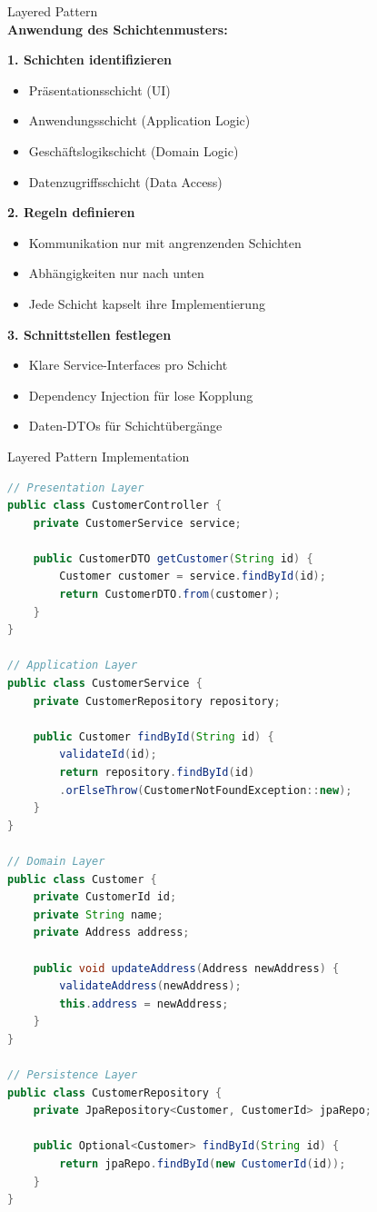 \begin{KR}{Layered Pattern}\\
\textbf{Anwendung des Schichtenmusters:}

\textbf{1. Schichten identifizieren}
\begin{itemize}
    \item Präsentationsschicht (UI)
    \item Anwendungsschicht (Application Logic)
    \item Geschäftslogikschicht (Domain Logic)
    \item Datenzugriffsschicht (Data Access)
\end{itemize}

\textbf{2. Regeln definieren}
\begin{itemize}
    \item Kommunikation nur mit angrenzenden Schichten
    \item Abhängigkeiten nur nach unten
    \item Jede Schicht kapselt ihre Implementierung
\end{itemize}

\textbf{3. Schnittstellen festlegen}
\begin{itemize}
    \item Klare Service-Interfaces pro Schicht
    \item Dependency Injection für lose Kopplung
    \item Daten-DTOs für Schichtübergänge
\end{itemize}
\end{KR}

\begin{example2}{Layered Pattern Implementation}
\begin{lstlisting}[language=Java, style=basesmol]
// Presentation Layer
public class CustomerController {
    private CustomerService service;
    
    public CustomerDTO getCustomer(String id) {
        Customer customer = service.findById(id);
        return CustomerDTO.from(customer);
    }
}

// Application Layer
public class CustomerService {
    private CustomerRepository repository;
    
    public Customer findById(String id) {
        validateId(id);
        return repository.findById(id)
        .orElseThrow(CustomerNotFoundException::new);
    }
}

// Domain Layer
public class Customer {
    private CustomerId id;
    private String name;
    private Address address;
    
    public void updateAddress(Address newAddress) {
        validateAddress(newAddress);
        this.address = newAddress;
    }
}

// Persistence Layer
public class CustomerRepository {
    private JpaRepository<Customer, CustomerId> jpaRepo;
    
    public Optional<Customer> findById(String id) {
        return jpaRepo.findById(new CustomerId(id));
    }
}
\end{lstlisting}
\end{example2}

